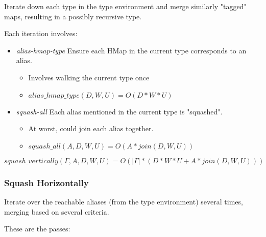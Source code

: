 Iterate down each type in the type environment and merge similarly "tagged"
maps, resulting in a possibly recursive type.

Each iteration involves:

\begin{itemize}
  \item \emph{alias-hmap-type} Ensure each HMap in the current type corresponds to an alias.
		\begin{itemize}
			\item Involves walking the current type once
			\item $alias\_hmap\_type(D,W,U) = O(D*W*U)$
		\end{itemize}
  \item \emph{squash-all} Each alias mentioned in the current type is "squashed".
		\begin{itemize}
			\item At worst, could join each alias together.
			\item $squash\_all(A,D,W,U) = O(A*join(D, W, U))$
		\end{itemize}
\end{itemize}

\[
squash\_vertically(\Gamma, A, D, W, U) = O(|\Gamma| * (D*W*U + A*join(D, W, U)))
\]

\subsubsection{Squash Horizontally}

Iterate over the reachable aliases (from the type environment)
several times, merging based on several criteria.

These are the passes:

